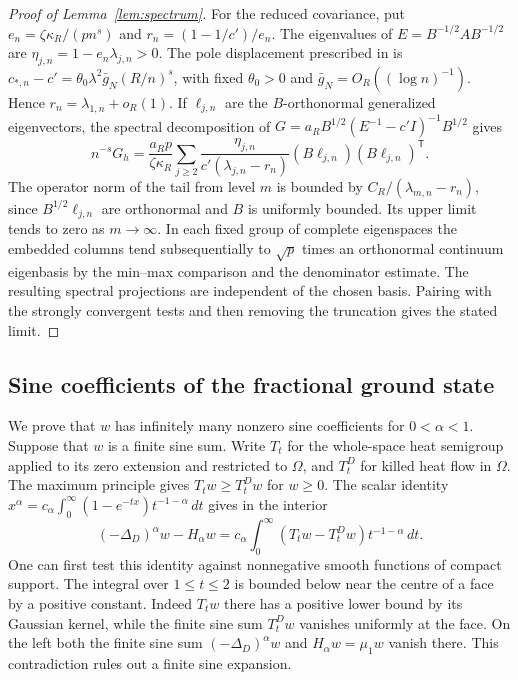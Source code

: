 \documentclass[11pt]{article}
\numberwithin{equation}{section}
\begin{document}
\begin{proof}[Proof of Lemma~\ref{lem:spectrum}]
For the reduced covariance, put
\(e_n=\zeta\kappa_R/(pn^s)\) and \(r_n=(1-1/c')/e_n\).
The eigenvalues of \(E=B^{-1/2}AB^{-1/2}\) are
\(\eta_{j,n}=1-e_n\lambda_{j,n}>0\).
The pole displacement prescribed in \cite[Section~2]{base} is
\(c_{*,n}-c'=\theta_0\lambda^2\bar g_N(R/n)^s\), with fixed
\(\theta_0>0\) and \(\bar g_N=O_R((\log n)^{-1})\).
Hence \(r_n=\lambda_{1,n}+o_R(1)\). If \(\ell_{j,n}\) are the
\(B\)-orthonormal generalized eigenvectors, the spectral decomposition
of \(G=a_R B^{1/2}(E^{-1}-c'I)^{-1}B^{1/2}\) gives
\begin{equation}
 n^{-s}G_h=\frac{a_Rp}{\zeta\kappa_R}
 \sum_{j\ge2}\frac{\eta_{j,n}}{c'(\lambda_{j,n}-r_n)}
       (B\ell_{j,n})(B\ell_{j,n})^{\mathsf T}.
\end{equation}
The operator norm of the tail from level \(m\) is bounded by
\(C_R/(\lambda_{m,n}-r_n)\), since \(B^{1/2}\ell_{j,n}\) are
orthonormal and \(B\) is uniformly bounded. Its upper limit tends
to zero as \(m\to\infty\). In each fixed group of complete
eigenspaces the embedded columns tend subsequentially to
\(\sqrt p\) times an orthonormal continuum eigenbasis by the
min--max comparison and the denominator estimate. The resulting
spectral projections are independent of the chosen basis. Pairing
with the strongly convergent tests and then removing the truncation
gives the stated limit.
\end{proof}

\subsection{Sine coefficients of the fractional ground state}\label{app:sine-support}

\noindent We prove that $w$ has infinitely many nonzero sine
coefficients for $0<\alpha<1$. Suppose that $w$ is a finite sine sum.
Write $T_t$ for the whole-space heat semigroup applied to its zero
extension and restricted to $\Omega$, and $T^D_t$ for killed heat
flow in $\Omega$. The maximum principle gives $T_t w\ge T^D_t w$
for $w\ge0$. The scalar identity
$x^\alpha=c_\alpha\int_0^\infty(1-e^{-tx})t^{-1-\alpha}\,dt$
gives in the interior
\begin{equation}
 (-\Delta_D)^\alpha w-H_\alpha w
   =c_\alpha\int_0^\infty (T_t w-T^D_t w)t^{-1-\alpha}\,dt .
\end{equation}
One can first test this identity against nonnegative smooth functions
of compact support. The integral over $1\le t\le2$ is bounded below
near the centre of a face by a positive constant. Indeed $T_t w$
there has a positive lower bound by its Gaussian kernel, while the
finite sine sum $T_t^D w$ vanishes uniformly at the face.
On the left both the finite sine sum $(-\Delta_D)^\alpha w$ and
$H_\alpha w=\mu_1 w$ vanish there. This contradiction rules out a
finite sine expansion.
\end{document}
